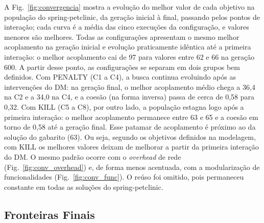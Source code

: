 \documentclass[conference]{IEEEtran}
\begin{document}
A Fig.~\ref{fig:convergencia} mostra a evolução do melhor valor de cada objetivo na população do spring-petclinic, da geração inicial à final, passando pelos pontos de interação; cada curva é a média das cinco execuções da configuração, e valores menores são melhores. Todas as configurações apresentam o mesmo melhor acoplamento na geração inicial e evolução praticamente idêntica até a primeira interação: o melhor acoplamento cai de 97 para valores entre 62 e 66 na geração 600. A partir desse ponto, as configurações se separam em dois grupos bem definidos. Com PENALTY (C1 a C4), a busca continua evoluindo após as intervenções do DM: na geração final, o melhor acoplamento médio chega a 36,4 na C2 e a 34,0 na C4, e a coesão (na forma inversa) passa de cerca de 0,58 para 0,32. Com KILL (C5 a C8), por outro lado, a população estagna logo após a primeira interação: o melhor acoplamento permanece entre 63 e 65 e a coesão em torno de 0,58 até a geração final. Esse patamar de acoplamento é próximo ao da solução do gabarito (63). Ou seja, segundo os objetivos definidos na modelagem, com KILL os melhores valores deixam de melhorar a partir da primeira interação do DM. O mesmo padrão ocorre com o \textit{overhead} de rede (Fig.~\ref{fig:conv_overhead}) e, de forma menos acentuada, com a modularização de funcionalidades (Fig.~\ref{fig:conv_func}). O reúso foi omitido, pois permaneceu constante em todas as soluções do spring-petclinic.

\subsection{Fronteiras Finais}\label{sec:res_paralelas}
\end{document}
